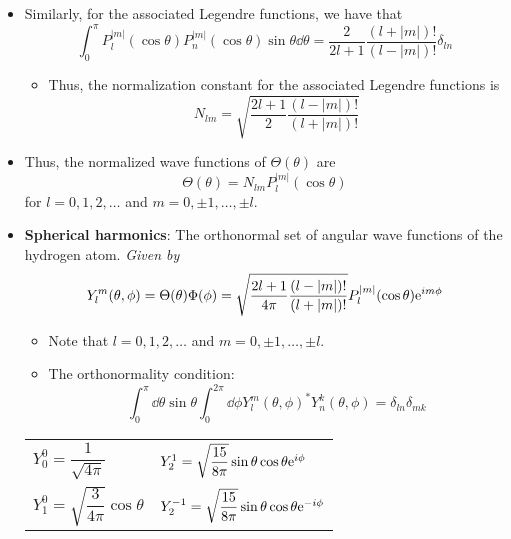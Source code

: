 \documentclass[../notes.tex]{subfiles}
\begin{document}
\begin{itemize}
    \item Similarly, for the associated Legendre functions, we have that
    \begin{equation*}
        \int_0^\pi P_l^{|m|}(\cos\theta)P_n^{|m|}(\cos\theta)\sin\theta\dd{\theta} = \frac{2}{2l+1}\frac{(l+|m|)!}{(l-|m|)!}\delta_{ln}
    \end{equation*}
    \begin{itemize}
        \item Thus, the normalization constant for the associated Legendre functions is
        \begin{equation*}
            N_{lm} = \sqrt{\frac{2l+1}{2}\frac{(l-|m|)!}{(l+|m|)!}}
        \end{equation*}
    \end{itemize}
    \item Thus, the normalized wave functions of $\Theta(\theta)$ are
    \begin{equation*}
        \Theta(\theta) = N_{lm}P_l^{|m|}(\cos\theta)
    \end{equation*}
    for $l=0,1,2,\dots$ and $m=0,\pm 1,\dots,\pm l$.
    \item \textbf{Spherical harmonics}: The orthonormal set of angular wave functions of the hydrogen atom. \emph{Given by}
    \begin{equation*}
        Y_l^m(\theta,\phi) = \Theta(\theta)\Phi(\phi)
        = \sqrt{\frac{2l+1}{4\pi}\frac{(l-|m|)!}{(l+|m|)!}}P_l^{|m|}(\cos\theta)\e[im\phi]
    \end{equation*}
    \begin{itemize}
        \item Note that $l=0,1,2,\dots$ and $m=0,\pm 1,\dots,\pm l$.
        \item The orthonormality condition:
        \begin{equation*}
            \int_0^\pi\dd{\theta}\sin\theta\int_0^{2\pi}\dd{\phi}Y_l^m(\theta,\phi)^*Y_n^k(\theta,\phi) = \delta_{ln}\delta_{mk}
        \end{equation*}
    \end{itemize}
    \begin{table}[h!]
        \centering
        \small
        \renewcommand{\arraystretch}{2.5}
        \begin{tabular}{ll}
            \toprule
            $Y_0^0=\dfrac{1}{\sqrt{4\pi}}$ & $Y_2^1=\sqrt{\dfrac{15}{8\pi}}\sin\theta\cos\theta\e[i\phi]$\\
            $Y_1^0=\sqrt{\dfrac{3}{4\pi}}\cos\theta$ & $Y_2^{-1}=\sqrt{\dfrac{15}{8\pi}}\sin\theta\cos\theta\e[-i\phi]$\\

\end{tabular}
\end{table}
\end{itemize}
\end{document}
